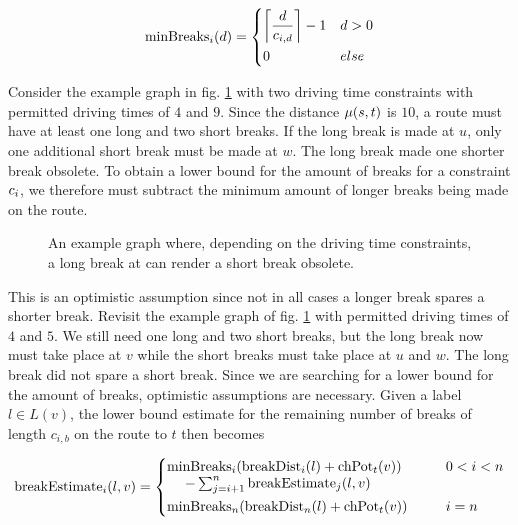 \begin{align}\label{eq:min_breaks_n}
	\minBreaks_i(d) = \begin{dcases}
		\ceil*{ \frac{d}{\restr_{i,d}} } - 1 & d > 0 \\
		0                                    & else
	\end{dcases}
\end{align}

Consider the example graph in fig. \ref{fig:graph_short_long_break} with two driving time constraints with permitted driving times of $4$ and $9$. Since the distance $\distance(s,t)$ is $10$, a route must have at least one long and two short breaks. If the long break is made at $u$, only one additional short break must be made at $w$. The long break made one shorter break obsolete. To obtain a lower bound for the amount of breaks for a constraint $\restr_i$, we therefore must subtract the minimum amount of longer breaks being made on the route.

\begin{figure}[hbtp]
	\centering
	
	\caption{An example graph where, depending on the driving time constraints, a long break at can render a short break obsolete.}
	\label{fig:graph_short_long_break}
\end{figure}

This is an optimistic assumption since not in all cases a longer break spares a shorter break. Revisit the example graph of fig. \ref{fig:graph_short_long_break} with permitted driving times of $4$ and $5$. We still need one long and two short breaks, but the long break now must take place at $v$ while the short breaks must take place at $u$ and $w$. The long break did not spare a short break. Since we are searching for a lower bound for the amount of breaks, optimistic assumptions are necessary. Given a label $l \in L(v)$, the lower bound estimate for the remaining number of breaks of length $c_{i,b}$ on the route to $t$ then becomes

\begin{align}\label{eq:number_breaks_sum}
	\breakEstimate_i(l,v)  =\begin{dcases}
		\parbox[t]{.55\textwidth}{$\minBreaks_i(\breakDist_i(l) + \chpotential_t(v))$ \\\phantom{{}=1}$- \sum_{j=i+1}^{n}{\breakEstimate_j(l,v)}$} & 0 < i < n \\
		\minBreaks_n(\breakDist_n(l) + \chpotential_t(v)) & i=n
	\end{dcases}
\end{align}


